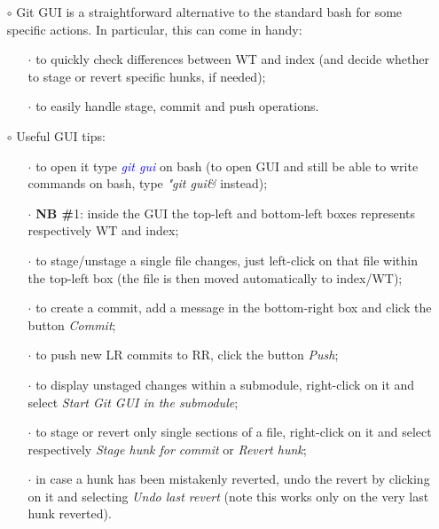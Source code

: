 \documentclass[a4paper,portrait,10pt]{article}   %
\newcommand{\mybulletlvA}{$\circ$}   %
\newcommand{\mybulletlvB}{$\cdot$}   %
\newcommand{\mycmd}[1]{\textcolor{blue}{\textit{#1}}}   %
\newcommand{\myparvspace}{\vspace{4mm}}   %
\newcommand{\mysecvspace}{\vspace{6mm}}   %
\begin{document}
\begin{itemize}
\item[\mybulletlvA] Git GUI is a straightforward alternative to the standard bash for some specific actions. In particular, this can come in handy:
\begin{itemize}
  \item[\mybulletlvB] to quickly check differences between WT and index (and decide whether to stage or revert specific hunks, if needed);
  \item[\mybulletlvB] to easily handle stage, commit and push operations.
\end{itemize}
\myparvspace

\item[\mybulletlvA] Useful GUI tips:
\begin{itemize}
  \item[\mybulletlvB] to open it type \mycmd{git gui} on bash (to open GUI and still be able to write commands on bash, type \textit{"git gui\&} instead);
  \item[\mybulletlvB] \textbf{NB \#}1: inside the GUI the top-left and bottom-left boxes represents respectively WT and index;
  \item[\mybulletlvB] to stage/unstage a single file changes, just left-click on that file within the top-left box (the file is then moved automatically to index/WT);
  \item[\mybulletlvB] to create a commit, add a message in the bottom-right box and click the button \textit{Commit};
  \item[\mybulletlvB] to push new LR commits to RR, click the button \textit{Push};
  \item[\mybulletlvB] to display unstaged changes within a submodule, right-click on it and select \textit{Start Git GUI in the submodule};
  \item[\mybulletlvB] to stage or revert only single sections of a file, right-click on it and select respectively \textit{Stage hunk for commit} or \textit{Revert hunk};
  \item[\mybulletlvB] in case a hunk has been mistakenly reverted, undo the revert by clicking on it and selecting \textit{Undo last revert} (note this works only on the very last hunk reverted).
\end{itemize}
\end{itemize}
\mysecvspace

\end{document}
